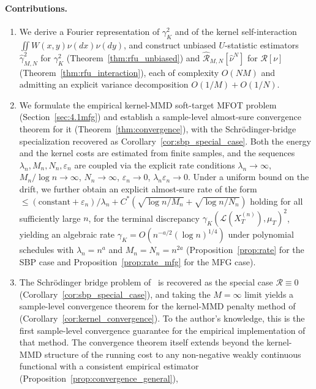 \documentclass[11pt,leqno]{article}
\theoremstyle{plain}
\theoremstyle{remark}
\theoremstyle{definition}
\numberwithin{equation}{section}
\numberwithin{figure}{section}
\numberwithin{table}{section}
\numberwithin{algorithm}{section}
\begin{document}
\paragraph{Contributions.}
\begin{enumerate}[label=\textup{(\roman*)}]
\item We derive a Fourier representation of $\gamma_K^2$ and of the kernel self-interaction $\iint W(x,y)\nu(dx)\nu(dy)$,
and construct unbiased $U$-statistic estimators
$\hat\gamma_{M,N}^2$ for $\gamma_K^2$ (Theorem~\ref{thm:rfu_unbiased})
and $\hat{\mathcal{R}}_{M,N}[\hat\nu^N]$ for $\mathcal{R}[\nu]$ (Theorem~\ref{thm:rfu_interaction}),
each of complexity $O(NM)$ and admitting an explicit variance decomposition $O(1/M)+O(1/N)$.
\item We formulate the empirical kernel-MMD soft-target MFOT problem (Section~\ref{sec:4.1mfg})
and establish a sample-level almost-sure convergence theorem for it
(Theorem~\ref{thm:convergence}), with the Schr{\"o}dinger-bridge specialization
recovered as Corollary~\ref{cor:sbp_special_case}.
Both the energy and the kernel costs are estimated from finite samples,
and the sequences $\lambda_n,M_n,N_n,\varepsilon_n$ are coupled via the explicit rate conditions
$\lambda_n\to\infty$, $M_n/\log n\to\infty$, $N_n\to\infty$, $\varepsilon_n\to 0$, $\lambda_n\varepsilon_n\to 0$.
Under a uniform bound on the drift, we further obtain an explicit almost-sure rate
of the form $\le(\text{constant}+\varepsilon_n)/\lambda_n+C^*(\sqrt{\log n/M_n}+\sqrt{\log n/N_n})$
holding for all sufficiently large $n$,
for the terminal discrepancy $\gamma_K(\mathcal{L}(X_T^{(n)}),\mu_T)^2$,
yielding an algebraic rate $\gamma_K=O(n^{-a/2}(\log n)^{1/4})$
under polynomial schedules with $\lambda_n=n^a$ and $M_n=N_n=n^{2a}$
(Proposition~\ref{prop:rate} for the SBP case and Proposition~\ref{prop:rate_mfg} for the MFG case).
\item The Schr{\"o}dinger bridge problem of~\cite{nak:2024sb} is recovered as the special case $\mathcal{R}\equiv 0$
(Corollary~\ref{cor:sbp_special_case}),
and taking the $M=\infty$ limit yields a sample-level convergence theorem for the kernel-MMD penalty method
of~\cite{nak:2024sb} (Corollary~\ref{cor:kernel_convergence}).
To the author's knowledge, this is the first sample-level convergence guarantee
for the empirical implementation of that method.
The convergence theorem itself extends beyond the kernel-MMD structure of the running cost
to any non-negative weakly continuous functional with a consistent empirical estimator
(Proposition~\ref{prop:convergence_general}),

\end{enumerate}
\end{document}
